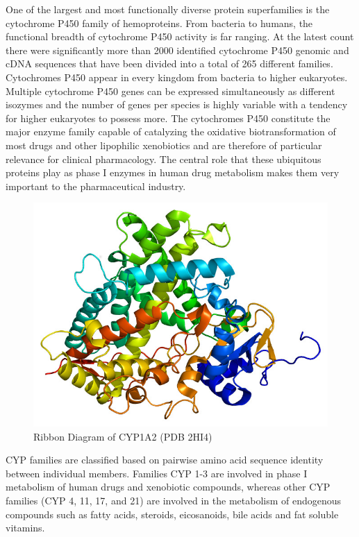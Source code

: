 One of the largest and most functionally diverse protein superfamilies is the cytochrome P450 family of hemoproteins. From bacteria to humans, the functional breadth of cytochrome P450 activity is far ranging. At the latest count there were significantly more than 2000 identified cytochrome P450 genomic and cDNA sequences that have been divided into a total of 265 different families. \cite{Danielson2002} Cytochromes P450 appear in every kingdom from bacteria to higher eukaryotes. Multiple cytochrome P450 genes can be expressed simultaneously as different isozymes and the number of genes per species is highly variable with a tendency for higher eukaryotes to possess more. The cytochromes P450  constitute the major enzyme family capable of catalyzing the oxidative biotransformation of most drugs and other lipophilic xenobiotics and are therefore of particular relevance for clinical pharmacology. The central role that these ubiquitous proteins play as phase I enzymes in human drug metabolism makes them very important to the pharmaceutical industry.

\begin{figure}[H]
  \centering
   \includegraphics[width=1\textwidth]{../img/CYP1A2_PDB.jpg}
  \caption[Ribbon Diagram of CYP1A2]{Ribbon Diagram of CYP1A2 (PDB 2HI4)}
\end{figure}

CYP families are classified based on pairwise amino acid sequence identity between individual members. Families CYP 1-3 are involved in phase I metabolism of human drugs and xenobiotic compounds, whereas other CYP families (CYP 4, 11, 17, and 21) are involved in the metabolism of endogenous compounds such as fatty acids, steroids, eicosanoids, bile acids and fat soluble vitamins. \cite{Singh2011}

